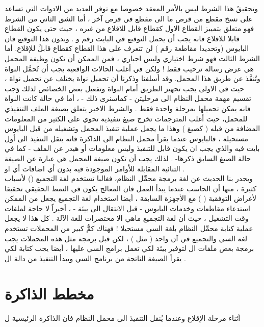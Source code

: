 \documentclass[document.tex]{subfiles}
\begin{document}
وتحقيقُ هذا الشرط ليس بالأمر المعقد خصوصا مع توفر العديد من الادوات التي تساعد على نسخ مقطع من قرص ما الى مقطع في قرص آخر ، أما الشق الثاني من الشرط فهو متعلق بتمييز القطاع الاول كقطاع قابل للاقلاع من غيره ، حيث حتى يكون القطاع قابلا للاقلاع فانه يجب أن يحمل التوقيع  في البايت رقم  و  . وبدون هذا التوقيع فان البايوس (وتحديدا مقاطعة رقم ) لن تتعرف على هذا القطاع كقطاع قابلٌ للإقلاع.
أما الشرط الثالث فهو شرط اختياري وليس اجباري ، فمن الممكن أن تكون وظيفة المحمل هي عرض رسالة ترحيب فقط ! ولكن في أغلب الحالات الواقعية يجب أن تُحمَّل النواة  وتُنفَّذ عن طريق هذا المحمل. وقد أسلفنا وذكرنا أن تحميل نواة  يختلف عن تحميل نواة  ، حيث في الاولى يجب تجهيز الطريق أمام النواة وتفعيل بعض الخصائص لذلك وَجب تقسيم مهمة محمل النظام الى مرحليتن - كماسنرى ذلك - ، أما في حالة كانت النواة  فانه يمكن تحميلها بمرحلة واحدة فقط .
والشرط الاخير يتعلق بصيغة الملف التنفيذي للمحمل، حيث أغلب المترجمات تخرج صيغ تنفيذية تحوي على الكثير من المعلومات المضافة من قبله ( كصيغ  ) وهذا ما يجعل عملية تنفيذ المحمل وتشغيله من قبل البايوس مستحيلة ، فالبايوس عندما يقرأ محمل النظام الى الذاكرة فانه ينقل التنفيذ الى أول بايت فيه والذي يجب ان يكون قابل للتنفيذ وليس معلومات أو هيدر عن الملف - كما في حالة الصيغ السابق ذكرها- . لذلك يجب أن تكون صيغة المحمل هي عبارة عن الصيغة الثنائية المقابلة للأوامر الموجودة فيه بدون أي اضافات أي  او  .\\

ويجدر بنا الحديث عن لغة برمجة محمِّل النظام، فغالبا تستخدم لغة التجميع () لأسباب كثيرة ، منها أن الحاسب عندما يبدأ العمل فان المعالج يكون في النمط الحقيقي تحقيقا لأغراض التوفقية (  ) مع الأجهزة السابقة ، أيضا استخدام لغة التجميع   يجعل من الممكن استدعاء مقاطعات وخدمات البايوس - قبل الانتقال الى بيئة  - ، أخيراً  لا حاجة لملفات وقت التشغيل  ، حيث أن لغة التجميع ماهي الا مختصرات للغة الآلة .
كل هذا لا يجعل عملية كتابة محمِّل النظام بلغة السي مستحيلا ! فهناك كمٌّ كبير من المحملات تستخدم لغة السي والتجميع في آن واحد ( مثل  ) ، لكن قبل برمجة مثل هذه المحملات يجب برمجة بعض ملفات ال  لتوفير بيئة لكي تعمل برامج السي عليها ، أيضا يجب كتابة  لكي يقرأ الصيغة الناتجة من برنامج السي ويبدأ التنفيذ من دالة ال  .

\section{مخطط الذاكرة}
أثناء مرحلة الإقلاع وعندما يُنقل التنفيذ الى محمل النظام فان الذاكرة الرئيسية ل
\end{document}
